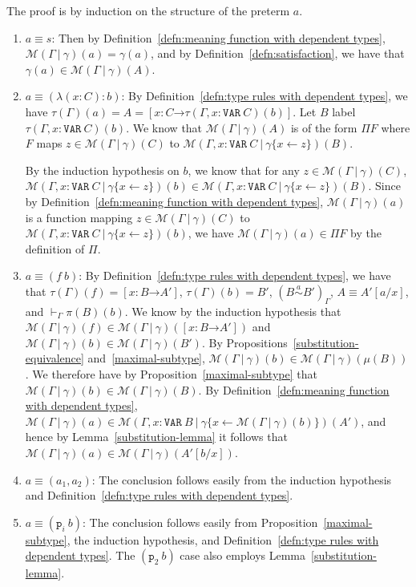 \documentclass [12pt,twoside]{cslreport}
\newcommand{\thmbox}
   {{\ \hfill\hbox{%
      \vrule width1.0ex height1.0ex
   }\parfillskip 0pt }}
\newenvironment{proof}{{\bf Proof. }}{\thmbox}
\newcommand{\aro}{\mathord\rightarrow} %
\newcommand{\funtype}[2]{[#1 \aro #2]}
\newcommand{\tauGamma}[1]{\tau(\Gamma)(#1)}
\newcommand{\Mgamma}[1]{{\mathcal M}(\Gamma\vbar\gamma)(#1)}
\newcommand{\proj}[1]{\mathtt{p}_{#1}}
\newcommand{\listwo}[2]{#1_{1}, #1_{2}}
\newcommand{\ttvar}{\mathtt{VAR}}
\newcommand{\vbar}{\ |\ }
\newcommand{\sima}{\stackrel{a}{\sim}} %
\begin{document}
\begin{proof}
The proof is by  induction on the structure of the preterm
$a$\@.
\begin{enumerate}
\item $a\equiv s$: Then  by
Definition~\ref{defn:meaning function with dependent types},
$\Mgamma{a} = \gamma(a)$, and by Definition~\ref{defn:satisfaction},
we have that $\gamma(a)\in \Mgamma{A}$\@.

\item $a \equiv (\lambda (x : C): b)$:  By
Definition~\ref{defn:type rules with dependent types}, we
have $\tauGamma{a} = A = \funtype{x : C}{\tau(\Gamma, x: \ttvar~C)(b)}$\@.
Let $B$ label $\tau(\Gamma, x: \ttvar~C)(b)$\@.  
We know that $\Mgamma{A}$ is of the form $\Pi{} F$ where
$F$ maps $z\in \Mgamma{C}$ to $\mathcal{M}(\Gamma, x : \ttvar~C\vbar \gamma\{x
\gets z\})(B)$\@.

By the induction hypothesis on $b$, we know that for any $z\in \Mgamma{C}$, 
$\mathcal{M}(\Gamma, x : \ttvar~C\vbar \gamma\{x \gets z\})(b)\in
\mathcal{M}(\Gamma, x : \ttvar~C\vbar \gamma\{x
\gets z\})(B)$\@.  
Since by Definition~\ref{defn:meaning function with dependent types},
$\Mgamma{a}$ is a function mapping $z\in \Mgamma{C}$ to
$\mathcal{M}(\Gamma, x : \ttvar~C\vbar \gamma\{x \gets z\})(b)$, we have
$\Mgamma{a} \in \Pi F$ by the
definition of $\Pi$\@.  

\item $a \equiv (f~b)$: By
Definition~\ref{defn:type rules with dependent types}, we have that
$\tauGamma{f} = \funtype{x : B}{A'}$, $\tauGamma{b} = B'$,
$(B \sima  B')_\Gamma$,  $A \equiv A'[a/x]$, and
$\vdash_\Gamma\pi(B)(b)$\@.  We know by the induction hypothesis
that $\Mgamma{f}\in \Mgamma{\funtype{x : B}{A'}}$ and
$\Mgamma{b} \in \Mgamma{B'}$\@.  By
Propositions~\ref{substitution-equivalence}
and~\ref{maximal-subtype},
$\Mgamma{b}\in \Mgamma{\mu(B)}$\@.  
We therefore have 
by Proposition~\ref{maximal-subtype} that $\Mgamma{b}\in \Mgamma{B}$\@.
By Definition~\ref{defn:meaning function with dependent types},
$\Mgamma{a}\in \mathcal{M}(\Gamma, x: \ttvar~B\vbar \gamma\{x\gets
\Mgamma{b}\})(A')$,
and hence  by Lemma~\ref{substitution-lemma} it follows that
$\Mgamma{a}\in \Mgamma{A'[b/x]}$\@.  

\item $a \equiv (\listwo{a}{n})$:  The conclusion follows easily from
the induction hypothesis and
Definition~\ref{defn:type rules with dependent types}\@.

\item $a\equiv (\proj{i}~b)$: The conclusion follows easily from
Proposition~\ref{maximal-subtype}, the  induction hypothesis,
and Definition~\ref{defn:type rules with dependent types}\@.
The $(\proj{2}~b)$ case also employs Lemma~\ref{substitution-lemma}\@.  
\end{enumerate}
\end{proof}
\end{document}
